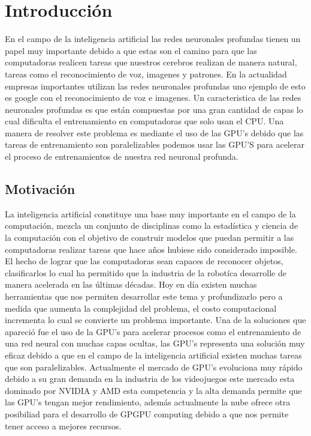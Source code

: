 \chapter{Introducción}
En el campo de la inteligencia artificial las redes neuronales profundas tienen un papel muy importante debido a que estas son el camino para que las computadoras realicen tareas que nuestros cerebros realizan de manera natural, tareas como el reconocimiento de voz, imagenes y patrones. En la actualidad empresas importantes utilizan las redes neuronales profundas uno ejemplo de esto es google con el reconocimiento de voz e imagenes. Un caracteristica de las redes neuronales profundas es que están compuestas por una gran cantidad de capas lo cual dificulta el entrenamiento en computadoras que solo usan el CPU. Una manera de resolver este problema es mediante el uso de las GPU's debido que las tareas de entrenamiento son paralelizables podemos usar las GPU'S para acelerar el proceso de entrenamientos de nuestra red neuronal profunda.

\section{Motivación}
La inteligencia artificial constituye una base muy importante en el campo de la computación, mezcla un conjunto de disciplinas como la estadística y ciencia de la computación con el objetivo de construir modelos que puedan permitir a las computadoras realizar tareas que hace años hubiese sido considerado imposible. El hecho de lograr que las computadoras sean capaces de reconocer objetos, clasificarlos lo cual ha permitido que la industria de la robotíca desarrolle de manera acelerada en las últimas décadas.  Hoy en día existen muchas herramientas que nos permiten desarrollar este tema y profundizarlo pero a medida que aumenta la complejidad del problema, el costo computacional incrementa lo cual se convierte un problema importante. Una de la soluciones que apareció fue el uso de la GPU's para acelerar procesos como el entrenamiento de una red neural con muchas capas ocultas, las GPU's representa una solución muy eficaz debido a que en el campo de la inteligencia artificial existen muchas tareas que son paralelizables. Actualmente el mercado de GPU's evoluciona muy rápido debido a su gran demanda en la industria de los videojuegos este mercado esta dominado por NVIDIA y AMD esta competencia y la alta demanda permite que las GPU's tengan mejor rendimiento, además actualmente la nube ofrece otra posibiliad para el desarrollo de GPGPU computing debido a que nos permite tener acceso a mejores recursos.

